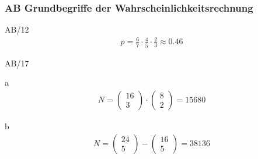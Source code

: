 \subsubsection{AB Grundbegriffe der Wahrscheinlichkeitsrechnung}
\begin{exercise}{AB/12}
  \begin{gather*}
    p = \frac{6}{7} \cdot \frac{4}{5} \cdot \frac{2}{3} \approx 0.46
  \end{gather*}
\end{exercise}
\begin{exercise}{AB/17}
  \item [a]
  \begin{gather*}
    N = \begin{pmatrix}16 \\ 3\end{pmatrix} \cdot \begin{pmatrix}8 \\ 2\end{pmatrix} = 15680
  \end{gather*}
  \item [b]
  \begin{gather*}
    N = \begin{pmatrix}24 \\ 5\end{pmatrix} - \begin{pmatrix}16 \\ 5\end{pmatrix} = 38136
  \end{gather*}
\end{exercise}
